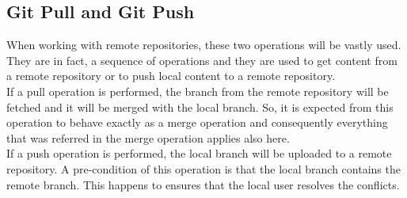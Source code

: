 \newpage
\subsection{Git Pull and Git Push}

When working with remote repositories, these two operations will be vastly
used. They are in fact, a sequence of operations and they are used to get content
from a remote repository or to push local content to a remote repository.\\

If a pull operation is performed, the branch from the remote repository will be fetched
and it will be merged with the local branch. So, it is expected from
this operation to behave exactly as a merge operation and consequently
everything that was referred in the merge operation applies also here. \\

If a push operation is performed, the local branch will be uploaded to
a remote repository. A pre-condition of this operation is that the
local branch contains the remote branch. This happens to ensures that
the local user resolves the conflicts.
